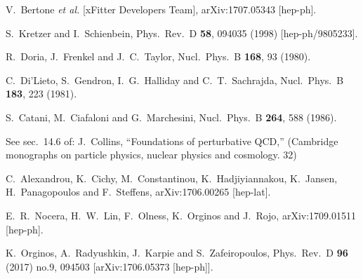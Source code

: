 \documentclass[letter,11pt]{article}
\begin{document}
\begin{thebibliography}{99}
  V.~Bertone {\it et al.} [xFitter Developers Team],
  arXiv:1707.05343 [hep-ph].

  S.~Kretzer and I.~Schienbein,
  Phys.\ Rev.\ D {\bf 58}, 094035 (1998)
  [hep-ph/9805233].
  
  R.~Doria, J.~Frenkel and J.~C.~Taylor,
  Nucl.\ Phys.\ B {\bf 168}, 93 (1980).

  C.~Di'Lieto, S.~Gendron, I.~G.~Halliday and C.~T.~Sachrajda,
  Nucl.\ Phys.\ B {\bf 183}, 223 (1981).

  S.~Catani, M.~Ciafaloni and G.~Marchesini,
  Nucl.\ Phys.\ B {\bf 264}, 588 (1986).

 See sec.~14.6 of: J.~Collins,
  ``Foundations of perturbative QCD,''
  (Cambridge monographs on particle physics, nuclear physics and cosmology. 32)
  
  C.~Alexandrou, K.~Cichy, M.~Constantinou, K.~Hadjiyiannakou, K.~Jansen, H.~Panagopoulos and F.~Steffens,
  arXiv:1706.00265 [hep-lat].
  
  E.~R.~Nocera, H.~W.~Lin, F.~Olness, K.~Orginos and J.~Rojo,
  arXiv:1709.01511 [hep-ph].

  K.~Orginos, A.~Radyushkin, J.~Karpie and S.~Zafeiropoulos,
  Phys.\ Rev.\ D {\bf 96} (2017) no.9,  094503
  [arXiv:1706.05373 [hep-ph]].


\end{thebibliography}
\end{document}
